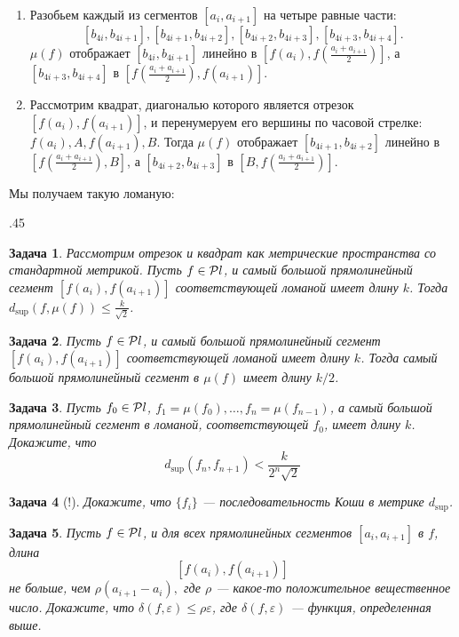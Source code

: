\documentclass[12pt]{book}
\renewcommand{\epsilon}{\varepsilon}
\theoremstyle{upshape}
\newtheorem{zadacha}{Задача}[chapter]
\theoremstyle{generic}
\theoremstyle{upshapenonumber}
\newcommand{\следствие}{%
     \refstepcounter{teorema}
     {\noindent\bf Следствие \thechapter.\arabic{teorema}:\ }}
\newcommand{\пример}{%
     \refstepcounter{teorema}
     {\noindent\bf Пример \thechapter.\arabic{teorema}:\ }}
\newcommand{\лемма}{%
     \refstepcounter{teorema}
     {\noindent\bf Лемма \thechapter.\arabic{teorema}:\ }}
\newcommand{\теорема}{%
     \refstepcounter{teorema}
     {\noindent\bf Теорема \thechapter.\arabic{teorema}:\ }}
\newcommand{\утверждение}{%
     \refstepcounter{teorema}
     {\noindent\bf Утверждение \thechapter.\arabic{teorema}:\ }}
\begin{document}
{\begin{enumerate}
\item Разобьем каждый из сегментов 
$[a_i, a_{i+1}]$ на четыре равные части:
\[ 
  [b_{4i},b_{4i+1}], [b_{4i+1},b_{4i+2}], 
  [b_{4i+2},b_{4i+3}], [b_{4i+3},b_{4i+4}].
\]
$\mu(f)$ отображает $[b_{4i},b_{4i+1}]$
линейно в $[f(a_i), f\left(\frac{a_i+a_{i+1}}2\right)]$,
а $[b_{4i+3},b_{4i+4}]$ в $[f\left(\frac{a_i+a_{i+1}}2\right), f(a_{i+1})]$.

\item Рассмотрим квадрат, диагональю которого
является отрезок $[f(a_i), f(a_{i+1})]$, и перенумеруем
его вершины по часовой стрелке: $f(a_i), A, f(a_{i+1}), B$.
Тогда $\mu(f)$ отображает $[b_{4i+1},b_{4i+2}]$
линейно в $[f\left(\frac{a_i+a_{i+1}}2\right), B]$,
а $[b_{4i+2},b_{4i+3}]$ в $[B, f\left(\frac{a_i+a_{i+1}}2\right)]$.
\end{enumerate}
Мы получаем такую ломаную:
\begin{center}
\epsfxsize .45\linewidth
{}
\end{center}

\begin{zadacha}
Рассмотрим отрезок и квадрат как метрические
пространства со стандартной метрикой.
Пусть $f\in {\cal P}l$, и самый большой прямолинейный
сегмент $[f(a_i), f(a_{i+1})]$ соответствующей ломаной
имеет длину $k$. Тогда $d_{\sup}(f, \mu(f)) \leq\frac{k}{\sqrt 2}$.
\end{zadacha}

\begin{zadacha} 
Пусть $f\in {\cal P}l$, и самый большой прямолинейный
сегмент $[f(a_i), f(a_{i+1})]$ соответствующей ломаной
имеет длину $k$. Тогда самый большой прямолинейный сегмент
в $\mu(f)$ имеет длину $k/2$.
\end{zadacha}

\begin{zadacha}
Пусть $f_0\in {\cal P}l$, $f_1 = \mu(f_0), \dots, f_n = \mu(f_{n-1})$,
а самый большой прямолинейный сегмент в ломаной, соответствующей
$f_0$, имеет длину $k$. Докажите, что 
\[
d_{\sup}(f_n, f_{n+1}) < \frac k {2^n \sqrt 2}
\]
\end{zadacha}

\begin{zadacha}[!]
Докажите, что $\{ f_i\}$ --- последовательность Коши
в метрике $d_{\sup}$.
\end{zadacha}

\begin{zadacha} 
Пусть $f\in {\cal P}l$, и для всех прямолинейных сегментов
$[a_i, a_{i+1}]$ в $f$, длина \[ [f(a_i), f(a_{i+1})]\]
не больше, чем $\rho(a_{i+1}-a_i),$ где $\rho$ --- какое-то
положительное вещественное число. 
Докажите, что $\delta(f, \epsilon)\leq \rho\epsilon$,
где $\delta(f, \epsilon)$ --- функция, определенная выше.
\end{zadacha}

}
\end{document}
